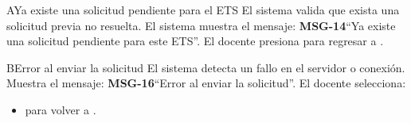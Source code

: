 \begin{UCtrayectoriaA}{A}{Ya existe una solicitud pendiente para el ETS}
	\UCpaso El sistema valida que exista una solicitud previa no resuelta.
	\UCpaso El sistema muestra el mensaje: {\bf MSG-14}{``Ya existe una solicitud pendiente para este ETS''}.
	\UCpaso[\UCactor] El docente presiona  para regresar a .
\end{UCtrayectoriaA}
\begin{UCtrayectoriaA}{B}{Error al enviar la solicitud}
	\UCpaso El sistema detecta un fallo en el servidor o conexión.
	\UCpaso Muestra el mensaje: {\bf MSG-16}{``Error al enviar la solicitud''}.
	\UCpaso[\UCactor] El docente selecciona:
	\begin{itemize}
		\item {} para volver a .
	\end{itemize}
\end{UCtrayectoriaA}
